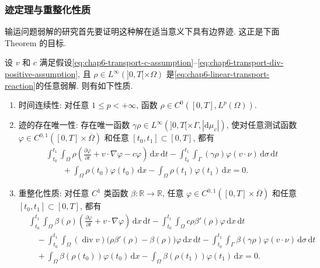 \begin{sloppypar}
\subsubsection{迹定理与重整化性质}
\label{subsec:chap6-trace-renormalization}

输运问题弱解的研究首先要证明这种解在适当意义下具有边界迹. 这正是下面 Theorem 的目标.

\begin{Theorem}
\label{thm:chap6-trace-renormalization}
设 $v$ 和 $c$ 满足假设\eqref{eq:chap6-transport-c-assumption}--\eqref{eq:chap6-transport-div-positive-assumption}, 且 $\rho\in L^\infty(]0,T[\times\Omega)$ 是\eqref{eq:chap6-linear-transport-reaction}的任意弱解. 则有如下性质.
\begin{enumerate}
 \item 时间连续性: 对任意 $1\leq p<+\infty$, 函数 $\rho\in C^0([0,T],L^p(\Omega))$.
 \item 迹的存在唯一性: 存在唯一函数 $\gamma\rho\in L^\infty(]0,T[\times\Gamma,|\mathrm d\mu_v|)$, 使对任意测试函数 $\varphi\in C^{0,1}([0,T]\times\overline\Omega)$ 和任意 $[t_0,t_1]\subset[0,T]$, 都有
 \begin{equation}
 \begin{aligned}
 &\int_{t_0}^{t_1}\int_\Omega
 \rho\left(\frac{\partial\varphi}{\partial t}+v\cdot\nabla\varphi-c\varphi\right)
 \,\mathrm dx\,\mathrm dt
 -\int_{t_0}^{t_1}\int_\Gamma(\gamma\rho)\varphi(v\cdot\nu)\,\mathrm d\sigma\,\mathrm dt\\
 &\qquad
 +\int_\Omega\rho(t_0)\varphi(t_0)\,\mathrm dx
 -\int_\Omega\rho(t_1)\varphi(t_1)\,\mathrm dx=0.
 \end{aligned}
 \label{eq:chap6-trace-green-formula}
 \end{equation}
 \item 重整化性质: 对任意 $C^1$ 类函数 $\beta:\mathbb R\to\mathbb R$, 任意 $\varphi\in C^{0,1}([0,T]\times\overline\Omega)$ 和任意 $[t_0,t_1]\subset[0,T]$, 都有
 \begin{equation}
 \begin{aligned}
 &\int_{t_0}^{t_1}\int_\Omega
 \beta(\rho)\left(\frac{\partial\varphi}{\partial t}+v\cdot\nabla\varphi\right)
 \,\mathrm dx\,\mathrm dt
 -\int_{t_0}^{t_1}\int_\Omega c\rho\beta'(\rho)\varphi\,\mathrm dx\,\mathrm dt\\
 &\quad
 -\int_{t_0}^{t_1}\int_\Omega(\operatorname{div}v)
 \bigl(\rho\beta'(\rho)-\beta(\rho)\bigr)\varphi\,\mathrm dx\,\mathrm dt
 -\int_{t_0}^{t_1}\int_\Gamma\beta(\gamma\rho)\varphi(v\cdot\nu)\,\mathrm d\sigma\,\mathrm dt\\
 &\quad
 +\int_\Omega\beta(\rho(t_0))\varphi(t_0)\,\mathrm dx
 -\int_\Omega\beta(\rho(t_1))\varphi(t_1)\,\mathrm dx=0.
 \end{aligned}
 \label{eq:chap6-renormalization-formula}
 \end{equation}
\end{enumerate}
\end{Theorem}


\end{sloppypar}
